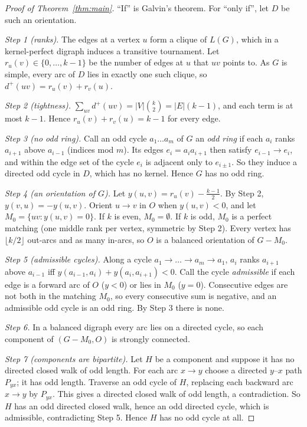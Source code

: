 \documentclass[11pt]{article}
\theoremstyle{plain}
\theoremstyle{definition}
\theoremstyle{remark}
\newcommand{\dout}{d^{+}}
\begin{document}
\begin{proof}[Proof of Theorem~\ref{thm:main}]
``If'' is Galvin's theorem. For ``only if'', let $D$ be such an orientation.

\emph{Step 1 (ranks).} The edges at a vertex $u$ form a clique of $L(G)$, which in a
kernel-perfect digraph induces a transitive tournament. Let $r_u(v) \in \{0, \dots, k-1\}$ be the
number of edges at $u$ that $uv$ points to. As $G$ is simple, every arc of $D$ lies in exactly
one such clique, so $\dout(uv) = r_u(v) + r_v(u)$.

\emph{Step 2 (tightness).} $\sum_{uv} \dout(uv) = |V| \binom{k}{2} = |E|(k-1)$, and each term is
at most $k-1$. Hence $r_u(v) + r_v(u) = k-1$ for every edge.

\emph{Step 3 (no odd ring).} Call an odd cycle $a_1 \dots a_m$ of $G$ an \emph{odd ring} if each
$a_i$ ranks $a_{i+1}$ above $a_{i-1}$ (indices mod $m$). Its edges $e_i = a_i a_{i+1}$ then
satisfy $e_{i-1} \to e_i$, and within the edge set of the cycle $e_i$ is adjacent only to
$e_{i \pm 1}$. So they induce a directed odd cycle in $D$, which has no kernel. Hence $G$ has no
odd ring.

\emph{Step 4 (an orientation of $G$).} Let $y(u,v) = r_u(v) - \frac{k-1}{2}$. By Step 2,
$y(v,u) = -y(u,v)$. Orient $u \to v$ in $O$ when $y(u,v) < 0$, and let $M_0 = \{uv : y(u,v) = 0\}$.
If $k$ is even, $M_0 = \emptyset$. If $k$ is odd, $M_0$ is a perfect matching (one middle rank per
vertex, symmetric by Step 2). Every vertex has $\lfloor k/2 \rfloor$ out-arcs and as many
in-arcs, so $O$ is a balanced orientation of $G - M_0$.

\emph{Step 5 (admissible cycles).} Along a cycle $a_1 \to \dots \to a_m \to a_1$, $a_i$ ranks
$a_{i+1}$ above $a_{i-1}$ iff $y(a_{i-1}, a_i) + y(a_i, a_{i+1}) < 0$. Call the cycle
\emph{admissible} if each edge is a forward arc of $O$ ($y < 0$) or lies in $M_0$ ($y = 0$).
Consecutive edges are not both in the matching $M_0$, so every consecutive sum is negative, and
an admissible odd cycle is an odd ring. By Step 3 there is none.

\emph{Step 6.} In a balanced digraph every arc lies on a directed cycle, so each component of
$(G - M_0, O)$ is strongly connected.

\emph{Step 7 (components are bipartite).} Let $H$ be a component and suppose it has no directed
closed walk of odd length. For each arc $x \to y$ choose a directed $y$--$x$ path $P_{yx}$; it has
odd length. Traverse an odd cycle of $H$, replacing each backward arc $x \to y$ by $P_{yx}$. This
gives a directed closed walk of odd length, a contradiction. So $H$ has an odd directed closed
walk, hence an odd directed cycle, which is admissible, contradicting Step 5. Hence $H$ has no
odd cycle at all.


\end{proof}
\end{document}
